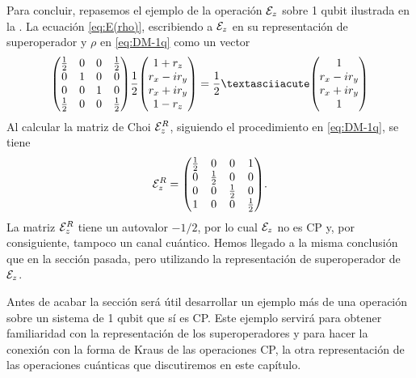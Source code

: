Para concluir, repasemos el ejemplo de la operación $\mathcal{E}_z$ sobre 1 qubit
ilustrada en la . La ecuación \eqref{eq:E(rho)}, 
escribiendo a $\mathcal{E}_z$ en su representación de superoperador y $\rho$ en 
\eqref{eq:DM-1q} como un vector
\begin{align}
\mqty(
\frac{1}{2} & 0 & 0 & \frac{1}{2} \\
0 & 1 & 0 & 0 \\
0 & 0 & 1 & 0 \\
\frac{1}{2} & 0 & 0 & \frac{1}{2} \\
)
\frac{1}{2}
\mqty(
1+r_z\\r_x-ir_y\\r_x+ir_y\\1-r_z
)
=
\frac{1}{2}´
\mqty(
1\\r_x-ir_y\\r_x+ir_y\\1
)
\end{align}
Al calcular la matriz de Choi $\mathcal{E}_z^{R}$, siguiendo el procedimiento
en \eqref{eq:DM-1q}, se tiene
\begin{align}
\E_z^R=
\mqty(
\frac{1}{2} & 0 & 0 & 1 \\
0 & \frac{1}{2} & 0 & 0 \\
0 & 0 & \frac{1}{2} & 0 \\
1 & 0 & 0 & \frac{1}{2} 
).
\end{align}
La matriz $\mathcal{E}_z^R$ tiene un autovalor $-1/2$, por lo cual $\mathcal{E}_z$ no es CP y,
por consiguiente, tampoco un canal cuántico. Hemos llegado a la misma 
conclusión que en la sección pasada, pero utilizando la representación 
de superoperador de $\mathcal{E}_z$.


Antes de acabar la sección será útil desarrollar un ejemplo más 
de una operación sobre un sistema de 1 qubit que sí es CP. Este 
ejemplo servirá para obtener familiaridad con la representación de 
los superoperadores y para hacer la conexión con 
la forma de Kraus de las operaciones CP, la otra representación de
las operaciones cuánticas que discutiremos en este capítulo.

